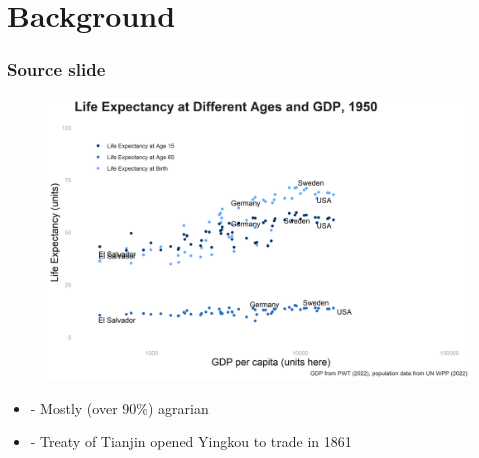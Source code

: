 \section{Background}



\begin{frame}[label = source-slide]
\frametitle{Source slide \hyperlink{data}{}}
\begin{figure}
\includegraphics[width=.5\textwidth]{figures/ECON-412/gdp_pc_le_1950.png} \vspace*{-.5cm}\\%
\end{figure}
\begin{itemize}
\item - Mostly (over 90\%) agrarian
\item - Treaty of Tianjin opened Yingkou to trade in 1861
\end{itemize}
\hyperlink{target-slide}{}
\end{frame} 


